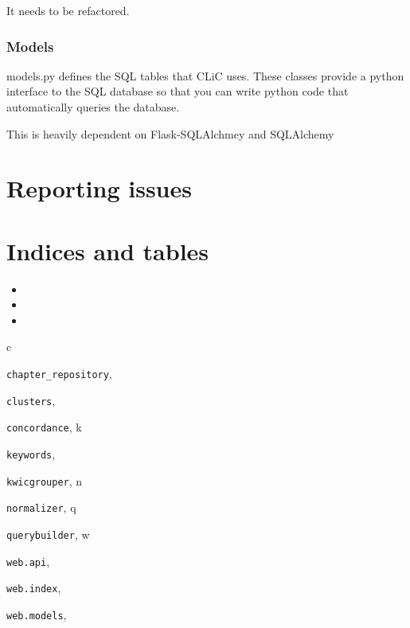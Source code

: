 \documentclass[letterpaper,10pt,english]{sphinxmanual}
\begin{document}
It needs to be refactored.


\subsection{Models}
\label{apidoc:models}\label{apidoc:module-web.models}
models.py defines the SQL tables that CLiC uses. These classes
provide a python interface to the SQL database so that you can write python
code that automatically queries the database.

This is heavily dependent on Flask-SQLAlchmey and SQLAlchemy


\chapter{Reporting issues}
\label{index:reporting-issues}

\chapter{Indices and tables}
\label{index:indices-and-tables}\begin{itemize}
\item {} 

\item {} 

\item {} 

\end{itemize}


\renewcommand{\indexname}{Python Module Index}
\begin{theindex}
\def\bigletter#1{{\Large\sffamily#1}\nopagebreak\vspace{1mm}}
\bigletter{c}
\item {\texttt{chapter\_repository}}, \pageref{apidoc:module-chapter_repository}
\item {\texttt{clusters}}, \pageref{apidoc:module-clusters}
\item {\texttt{concordance}}, \pageref{apidoc:module-concordance}
\indexspace
\bigletter{k}
\item {\texttt{keywords}}, \pageref{apidoc:module-keywords}
\item {\texttt{kwicgrouper}}, \pageref{apidoc:module-kwicgrouper}
\indexspace
\bigletter{n}
\item {\texttt{normalizer}}, \pageref{apidoc:module-normalizer}
\indexspace
\bigletter{q}
\item {\texttt{querybuilder}}, \pageref{apidoc:module-querybuilder}
\indexspace
\bigletter{w}
\item {\texttt{web.api}}, \pageref{apidoc:module-web.api}
\item {\texttt{web.index}}, \pageref{apidoc:module-web.index}
\item {\texttt{web.models}}, \pageref{apidoc:module-web.models}
\end{theindex}

\renewcommand{\indexname}{Index}
\printindex
\end{document}
